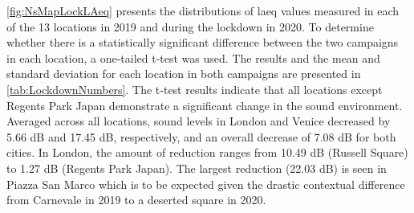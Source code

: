
\cref{fig:NsMapLockLAeq} presents the distributions of \gls{laeq} values measured in each of the 13 locations in 2019 and during the lockdown in 2020. To determine whether there is a statistically significant difference between the two campaigns in each location, a one-tailed t-test was used. The results and the mean and standard deviation for each location in both campaigns are presented in \cref{tab:LockdownNumbers}. 
The t-test results indicate that all locations except Regents Park Japan demonstrate a significant change in the sound environment. Averaged across all locations, sound levels in London and Venice decreased by 5.66 dB and 17.45 dB, respectively, and an overall decrease of 7.08 dB for both cities. In London, the amount of reduction ranges from 10.49 dB (Russell Square) to 1.27 dB (Regents Park Japan). The largest reduction (22.03 dB) is seen in Piazza San Marco which is to be expected given the drastic contextual difference from Carnevale in 2019 to a deserted square in 2020. 


